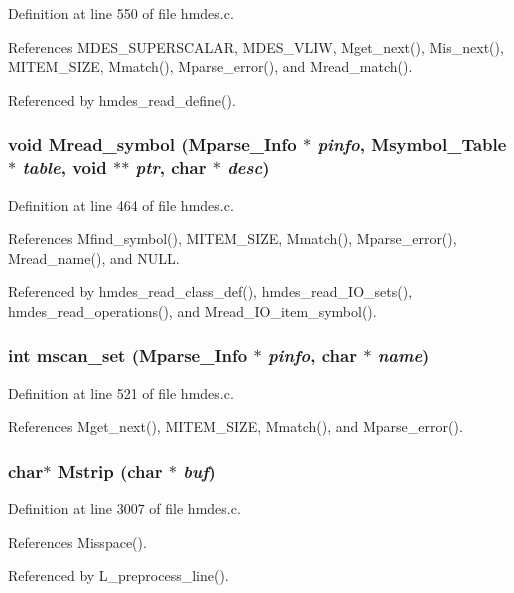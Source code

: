 Definition at line 550 of file hmdes.c.

References MDES\_\-SUPERSCALAR, MDES\_\-VLIW, Mget\_\-next(), Mis\_\-next(), MITEM\_\-SIZE, Mmatch(), Mparse\_\-error(), and Mread\_\-match().

Referenced by hmdes\_\-read\_\-define().
\subsubsection{\setlength{\rightskip}{0pt plus 5cm}void Mread\_\-symbol (\bf{Mparse\_\-Info} $\ast$ {\em pinfo}, \bf{Msymbol\_\-Table} $\ast$ {\em table}, void $\ast$$\ast$ {\em ptr}, char $\ast$ {\em desc})}\label{hmdes_8c_f06d6c42e20b1f16afe72019cce9feb3}




Definition at line 464 of file hmdes.c.

References Mfind\_\-symbol(), MITEM\_\-SIZE, Mmatch(), Mparse\_\-error(), Mread\_\-name(), and NULL.

Referenced by hmdes\_\-read\_\-class\_\-def(), hmdes\_\-read\_\-IO\_\-sets(), hmdes\_\-read\_\-operations(), and Mread\_\-IO\_\-item\_\-symbol().
\subsubsection{\setlength{\rightskip}{0pt plus 5cm}int mscan\_\-set (\bf{Mparse\_\-Info} $\ast$ {\em pinfo}, char $\ast$ {\em name})}\label{hmdes_8c_e31ac28eb1189aa14d222358f54daaae}




Definition at line 521 of file hmdes.c.

References Mget\_\-next(), MITEM\_\-SIZE, Mmatch(), and Mparse\_\-error().
\subsubsection{\setlength{\rightskip}{0pt plus 5cm}char$\ast$ Mstrip (char $\ast$ {\em buf})}\label{hmdes_8c_4fcb92f95a2a4cd3b2beefcf2f8afef8}




Definition at line 3007 of file hmdes.c.

References Misspace().

Referenced by L\_\-preprocess\_\-line().

